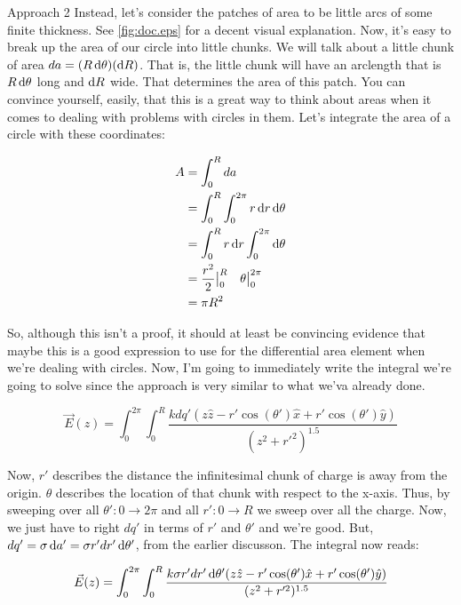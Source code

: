 \begin{homeworkProblem}
\begin{homeworkSection}{Approach 2}
        Instead, let's consider the patches of area to be little arcs of
        some finite thickness. See \ref{fig:doc.eps} for a decent visual
        explanation.  Now, it's easy to break up the area of our circle
        into little chunks. We will talk about a little chunk of area
        $da = (R \mathop{}\!\mathrm{d} \theta)(\mathop{}\!\mathrm{d} R)$. That is, the little chunk will
        have an arclength that is $R \mathop{}\!\mathrm{d} \theta$ long and $\mathop{}\!\mathrm{d} R$
        wide. That determines the area of this patch. You can convince
        yourself, easily, that this is a great way to think about areas
        when it comes to dealing with problems with circles in them.
        Let's integrate the area of a circle with these coordinates:

        \begin{align}
            A &= \int_0^R da \nonumber \\
            &=  \int_0^R \int_0^{2\pi} r \mathop{}\!\mathrm{d} r \mathop{}\!\mathrm{d} \theta
            \nonumber \\
            &= \int_0^R r \mathop{}\!\mathrm{d} r \int_0^{2\pi} \mathop{}\!\mathrm{d} \theta \nonumber \\
            &= \frac{r^2}{2}\big|_0^R \quad \theta\big|_0^{2\pi}
            \nonumber \\
            &= \pi R^2 \nonumber 
        \end{align}

        So, although this isn't a proof, it should at least be
        convincing evidence that maybe this is a good expression to use
        for the differential area element when we're dealing with
        circles. Now, I'm going to immediately write the integral we're
        going to solve since the approach is very similar to what we'va
        already done.

        \[ \vec{E}(z) = \int_0^{2\pi} \int_0^R \frac{k dq' (z \hat{z}-
        r'\cos(\theta')\hat{x}+r'\cos(\theta')\hat{y})}{(z^2+r'^2)^{1.5}}
        \]

        Now, $r'$ describes the distance the infinitesimal chunk of
        charge is away from the origin. $\theta$ describes the location
        of that chunk with respect to the x-axis. Thus, by sweeping over
        all $\theta': 0 \rightarrow 2\pi$ and all $r': 0 \rightarrow R$ we
        sweep over all the charge. Now, we just have to right $dq'$ in
        terms of $r'$ and $\theta'$ and we're good. But, $dq' = \sigma
        \mathop{}\!\mathrm{d} a' = \sigma r' dr' \mathop{}\!\mathrm{d} \theta'$, from the earlier
        discusson. The integral now reads:

        \[ \vec{E}(z) = \int_0^{2\pi} \int_0^R \frac{k \sigma r' dr'
        \mathop{}\!\mathrm{d} \theta' (z \hat{z}-
        r'\cos(\theta')\hat{x}+r'\cos(\theta')\hat{y})}{(z^2+r'^2)^{1.5}}
        \]


\end{homeworkSection}
\end{homeworkProblem}
